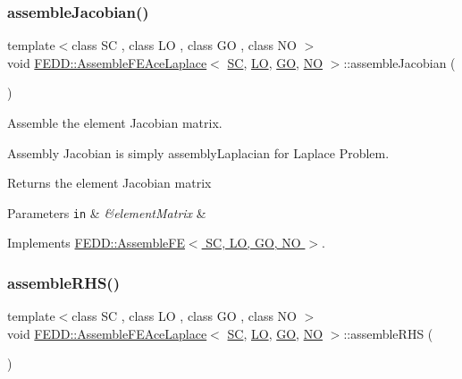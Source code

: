 \subsubsection{\texorpdfstring{assemble\+Jacobian()}{assembleJacobian()}}
{\footnotesize\ttfamily template$<$class SC , class LO , class GO , class NO $>$ \\
void \hyperlink{classFEDD_1_1AssembleFEAceLaplace}{F\+E\+D\+D\+::\+Assemble\+F\+E\+Ace\+Laplace}$<$ \hyperlink{fe__test__laplace_8cpp_a79c7e86a57edbb2a5a53242bcd04e41e}{SC}, \hyperlink{fe__test__laplace_8cpp_ad6a38c9f07d3fd633eefca5bccad8410}{LO}, \hyperlink{fe__test__laplace_8cpp_afa2946b509009b4f45eb04bd8c5b27d9}{GO}, \hyperlink{fe__test__laplace_8cpp_a5e24f37b28787429872b6ecb1d0417ce}{NO} $>$\+::assemble\+Jacobian (\begin{DoxyParamCaption}{ }\end{DoxyParamCaption})\hspace{0.3cm}{\ttfamily [virtual]}}



Assemble the element Jacobian matrix. 

Assembly Jacobian is simply assembly\+Laplacian for Laplace Problem.

\begin{DoxyReturn}{Returns}
the element Jacobian matrix
\end{DoxyReturn}

\begin{DoxyParams}[1]{Parameters}
\mbox{\tt in}  & {\em \&element\+Matrix} & \\
\hline
\end{DoxyParams}


Implements \hyperlink{classFEDD_1_1AssembleFE_af48b450dfdf6cea7beeb24feef7dc10f}{F\+E\+D\+D\+::\+Assemble\+F\+E$<$ S\+C, L\+O, G\+O, N\+O $>$}.

\mbox{\label{classFEDD_1_1AssembleFEAceLaplace_a6d2759738ff7b596b4f132bf234c772a}} 
\subsubsection{\texorpdfstring{assemble\+R\+H\+S()}{assembleRHS()}}
{\footnotesize\ttfamily template$<$class SC , class LO , class GO , class NO $>$ \\
void \hyperlink{classFEDD_1_1AssembleFEAceLaplace}{F\+E\+D\+D\+::\+Assemble\+F\+E\+Ace\+Laplace}$<$ \hyperlink{fe__test__laplace_8cpp_a79c7e86a57edbb2a5a53242bcd04e41e}{SC}, \hyperlink{fe__test__laplace_8cpp_ad6a38c9f07d3fd633eefca5bccad8410}{LO}, \hyperlink{fe__test__laplace_8cpp_afa2946b509009b4f45eb04bd8c5b27d9}{GO}, \hyperlink{fe__test__laplace_8cpp_a5e24f37b28787429872b6ecb1d0417ce}{NO} $>$\+::assemble\+R\+HS (\begin{DoxyParamCaption}{ }\end{DoxyParamCaption})\hspace{0.3cm}{\ttfamily [virtual]}}



